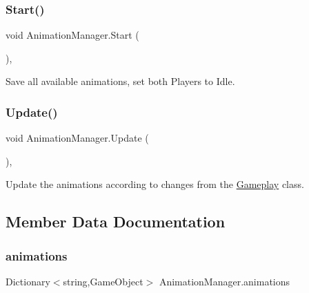 \subsubsection{\texorpdfstring{Start()}{Start()}}
{\footnotesize\ttfamily void Animation\+Manager.\+Start (\begin{DoxyParamCaption}{ }\end{DoxyParamCaption})\hspace{0.3cm}{\ttfamily [inline]}, {\ttfamily [private]}}



Save all available animations, set both Players to Idle. 

\mbox{\label{class_animation_manager_ab9a2c78491bf79117b01db0a26b7f12d}} 
\subsubsection{\texorpdfstring{Update()}{Update()}}
{\footnotesize\ttfamily void Animation\+Manager.\+Update (\begin{DoxyParamCaption}{ }\end{DoxyParamCaption})\hspace{0.3cm}{\ttfamily [inline]}, {\ttfamily [private]}}



Update the animations according to changes from the \mbox{\hyperlink{class_gameplay}{Gameplay}} class. 



\subsection{Member Data Documentation}
\mbox{\label{class_animation_manager_a9300d9a81ec105f22aad052a4f04eca1}} 
\subsubsection{\texorpdfstring{animations}{animations}}
{\footnotesize\ttfamily Dictionary$<$string,Game\+Object$>$ Animation\+Manager.\+animations\hspace{0.3cm}{\ttfamily [private]}}



